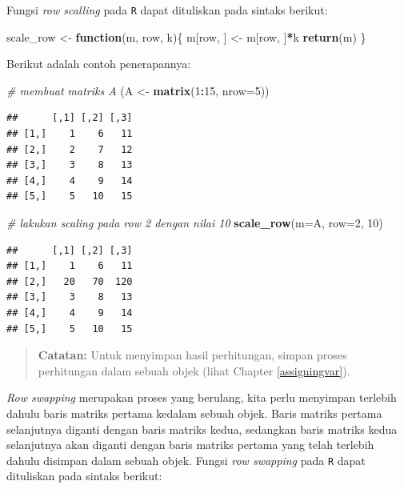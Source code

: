 \documentclass[
]{book}
\newenvironment{Shaded}{\begin{snugshade}}{\end{snugshade}}
\newcommand{\AttributeTok}[1]{\textcolor[rgb]{0.13,0.29,0.53}{#1}}
\newcommand{\CommentTok}[1]{\textcolor[rgb]{0.56,0.35,0.01}{\textit{#1}}}
\newcommand{\ControlFlowTok}[1]{\textcolor[rgb]{0.13,0.29,0.53}{\textbf{#1}}}
\newcommand{\DecValTok}[1]{\textcolor[rgb]{0.00,0.00,0.81}{#1}}
\newcommand{\FunctionTok}[1]{\textcolor[rgb]{0.13,0.29,0.53}{\textbf{#1}}}
\newcommand{\NormalTok}[1]{#1}
\newcommand{\OtherTok}[1]{\textcolor[rgb]{0.56,0.35,0.01}{#1}}
\newcommand{\SpecialCharTok}[1]{\textcolor[rgb]{0.81,0.36,0.00}{\textbf{#1}}}
\theoremstyle{definition}
\theoremstyle{definition}
\theoremstyle{definition}
\theoremstyle{definition}
\theoremstyle{remark}
\begin{document}
Fungsi \emph{row scalling} pada \texttt{R} dapat dituliskan pada sintaks berikut:

\begin{Shaded}
\begin{Highlighting}[]
\NormalTok{scale\_row }\OtherTok{\textless{}{-}} \ControlFlowTok{function}\NormalTok{(m, row, k)\{}
\NormalTok{ m[row, ] }\OtherTok{\textless{}{-}}\NormalTok{ m[row, ]}\SpecialCharTok{*}\NormalTok{k}
 \FunctionTok{return}\NormalTok{(m)}
\NormalTok{\}}
\end{Highlighting}
\end{Shaded}

Berikut adalah contoh penerapannya:

\begin{Shaded}
\begin{Highlighting}[]
\CommentTok{\# membuat matriks A}
\NormalTok{(A }\OtherTok{\textless{}{-}} \FunctionTok{matrix}\NormalTok{(}\DecValTok{1}\SpecialCharTok{:}\DecValTok{15}\NormalTok{, }\AttributeTok{nrow=}\DecValTok{5}\NormalTok{))}
\end{Highlighting}
\end{Shaded}

\begin{verbatim}
##      [,1] [,2] [,3]
## [1,]    1    6   11
## [2,]    2    7   12
## [3,]    3    8   13
## [4,]    4    9   14
## [5,]    5   10   15
\end{verbatim}

\begin{Shaded}
\begin{Highlighting}[]
\CommentTok{\# lakukan scaling pada row 2 dengan nilai 10}
\FunctionTok{scale\_row}\NormalTok{(}\AttributeTok{m=}\NormalTok{A, }\AttributeTok{row=}\DecValTok{2}\NormalTok{, }\DecValTok{10}\NormalTok{)}
\end{Highlighting}
\end{Shaded}

\begin{verbatim}
##      [,1] [,2] [,3]
## [1,]    1    6   11
## [2,]   20   70  120
## [3,]    3    8   13
## [4,]    4    9   14
## [5,]    5   10   15
\end{verbatim}

\begin{quote}
\textbf{Catatan:} Untuk menyimpan hasil perhitungan, simpan proses perhitungan dalam sebuah objek (lihat Chapter \ref{assigningvar}).
\end{quote}

\emph{Row swapping} merupakan proses yang berulang, kita perlu menyimpan terlebih dahulu baris matriks pertama kedalam sebuah objek. Baris matriks pertama selanjutnya diganti dengan baris matriks kedua, sedangkan baris matriks kedua selanjutnya akan diganti dengan baris matriks pertama yang telah terlebih dahulu disimpan dalam sebuah objek. Fungsi \emph{row swapping} pada \texttt{R} dapat dituliskan pada sintaks berikut:
\end{document}
